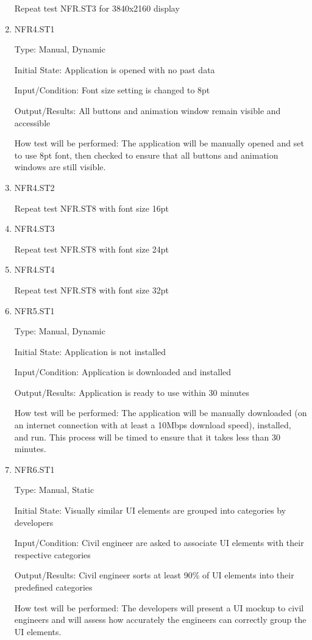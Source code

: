 \documentclass[12pt, titlepage]{article}
\begin{document}
\begin{enumerate}
Repeat test NFR.ST3 for 3840x2160 display

\item{NFR4.ST1\\}

Type: Manual, Dynamic

Initial State: Application is opened with no past data

Input/Condition: Font size setting is changed to 8pt

Output/Results: All buttons and animation window remain visible and accessible

How test will be performed: The application will be manually opened and set to use 8pt font, then checked to ensure that all buttons and animation windows are still visible.

\item{NFR4.ST2\\}

Repeat test NFR.ST8 with font size 16pt

\item{NFR4.ST3\\}

Repeat test NFR.ST8 with font size 24pt

\item{NFR4.ST4\\}

Repeat test NFR.ST8 with font size 32pt

\item{NFR5.ST1\\}

Type: Manual, Dynamic

Initial State: Application is not installed

Input/Condition: Application is downloaded and installed

Output/Results: Application is ready to use within 30 minutes

How test will be performed: The application will be manually downloaded (on an internet connection with at least a 10Mbps download speed), installed, and run. This process will be timed to ensure that it takes less than 30 minutes.

\item{NFR6.ST1\\}

Type: Manual, Static

Initial State: Visually similar UI elements are grouped into categories by developers

Input/Condition: Civil engineer are asked to associate UI elements with their respective categories

Output/Results: Civil engineer sorts at least 90\% of UI elements into their predefined categories

How test will be performed: The developers will present a UI mockup to civil engineers and will assess how accurately the engineers can correctly group the UI elements.

\end{enumerate}
\end{document}
